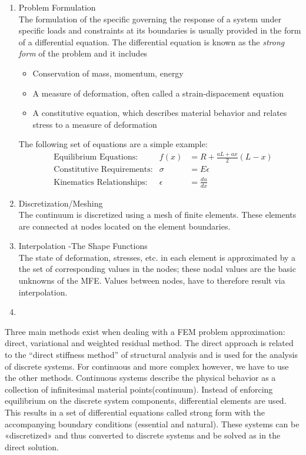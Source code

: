 \begin{enumerate}
\item Problem Formulation\\
The formulation of the specific governing the response of a system under specific loads and constraints at its boundaries is usually provided in the form of a differential equation. The differential equation is known as the \textit{strong form} of the problem and it includes
\begin{itemize}
\item Conservation of mass, momentum, energy
\item A measure of deformation, often called a strain-dispacement equation
\item A constitutive equation, which describes material behavior and relates stress to a measure of deformation
\end{itemize}
The following set of equations are a simple example:
\begin{align}
&\textrm{Equilibrium Equations:} &f(x)&=R+\frac{aL+ax}{2}(L-x)\\
&\textrm{Constitutive Requirements:}& \sigma&=E\epsilon\\
&\textrm{Kinematics Relationships:}& \epsilon&=\frac{du}{dx}
\end{align}
\item Discretization/Meshing\\
The continuum is discretized using a mesh of finite elements. These elements are connected at nodes located on the element boundaries.
\item Interpolation -The Shape Functions\\
The state of deformation, stresses, etc. in each element is approximated by a the set of corresponding values in the nodes; these nodal values are the basic unknowns of the MFE. Values between nodes, have to therefore result via interpolation.
\item 
\end{enumerate}


Three main methods exist when dealing with a FEM problem approximation: direct, variational and weighted residual method.
The direct approach is related to the “direct stiffness method” of structural analysis and is used for the analysis of discrete systems. For continuous and more complex  however, we have to use the other methods.
Continuous systems describe the physical behavior as a collection of infinitesimal material points(continuum).
Instead of enforcing equilibrium on the discrete system components, differential elements are used.
This results in a set of differential equations called strong form with the accompanying boundary conditions (essential and natural). 
These systems can be «discretized» and thus converted to discrete systems and be solved as in the direct solution.

